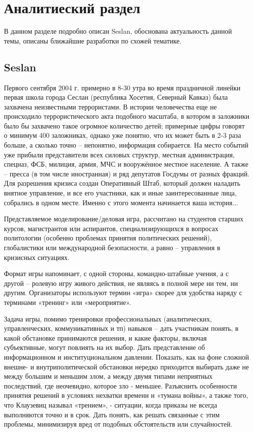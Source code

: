 \newpage
\section{Аналитиеский раздел}
	
	В данном разделе подробно описан Seslan, обоснована актуальность данной темы, описаны ближайшие разработки по схожей тематике.

\subsection{Seslan}

	Первого сентября 2004 г. примерно в 8-30 утра во время праздничной линейки первая школа города Сеслан  (республика Хосетия, Северный Кавказ) была захвачена неизвестными террористами. 
	В истории человечества еще не происходило террористического акта подобного масштаба, в котором в заложники было бы захвачено такое огромное количество детей; примерные цифры говорят о минимум 400 заложниках, однако уже понятно, что  их может быть в 2-3  раза больше, а сколько точно – непонятно, информация собирается. 
	На место событий уже прибыли представители всех силовых структур, местная администрация, спецназ, ФСБ, милиция,  армия, МЧС и вооружённое местное население. 
	А также – пресса (в том числе иностранная) и ряд депутатов Госдумы от разных фракций. 
	Для разрешения кризиса создан Оперативный Штаб, который должен наладить внятное управление, и все его участники, как и иные заинтересованные лица, собрались в одном месте. Именно с этого момента начинается  ваша история...
	
	Представляемое моделирование/деловая игра, рассчитано на студентов старших курсов, магистрантов или аспирантов, специализирующихся в вопросах политологии (особенно проблемах принятия политических решений), глобалистики или международной безопасности, а равно – управления в кризисных ситуациях.
	
	Формат игры напоминает, с одной стороны, командно-штабные учения, а с другой – ролевую игру живого действия, не являясь в полной мере ни тем, ни другим. Организаторы используют термин «игра» скорее для удобства наряду с терминами «тренинг» или «мероприятие».
	
	Задача игры, помимо тренировки профессиональных (аналитических, управленческих, коммуникативных и тп) навыков – дать участникам  понять, в какой обстановке принимаются решения, и какие факторы, включая субъективные, могут повлиять на их выбор. 
	Дать представление  об информационном и институциональном давлении.  Показать, как  на фоне сложной внешне- и внутриполитической обстановки нередко приходится выбирать даже не между большим и меньшим злом,  а между двумя типами неприятных последствий, где неочевидно, которое зло -  меньшее.  
	Разъяснить особенности принятия решений в условиях нехватки времени и «тумана войны», а также того, что Клаузевиц называл «трением», - ситуации, когда приказы не всегда выполняются точно и в срок. 
	Дать понять, как решать связанные с этим проблемы, минимизируя вред от подобных обстоятельств или случайностей.
	
